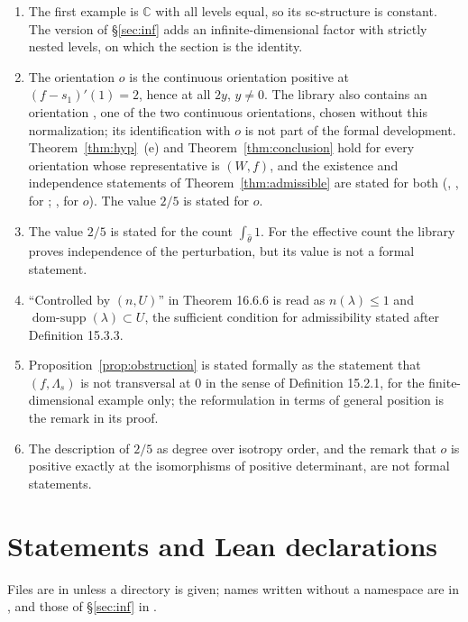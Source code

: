 \documentclass[11pt,a4paper]{article}
\theoremstyle{plain}
\theoremstyle{definition}
\theoremstyle{remark}
\newcommand{\C}{\mathbb{C}}
\newcommand{\domsupp}{\operatorname{dom-supp}}
\begin{document}
\begin{enumerate}[label=(\arabic*)]
\item The first example is $\C$ with all levels equal, so its sc-structure is constant. The version of
  \S\ref{sec:inf} adds an infinite-dimensional factor with strictly nested levels, on which the section is
  the identity.
\item The orientation $o$ is the continuous orientation positive at $(f-s_1)'(1)=2$, hence at all
  $2y$, $y\neq0$. The library also contains an orientation , one of the two
  continuous orientations, chosen without this normalization; its identification with $o$ is not part of
  the formal development. Theorem~\ref{thm:hyp}~(e) and Theorem~\ref{thm:conclusion} hold for every
  orientation whose representative is $(W,f)$, and the existence and independence statements of
  Theorem~\ref{thm:admissible} are stated for both (, ,
   for ; ,
   for $o$). The value $2/5$ is stated for $o$.
\item The value $2/5$ is stated for the count $\int_{\hat\theta}1$. For the effective count the library
  proves independence of the perturbation, but its value is not a formal statement.
\item ``Controlled by $(n,U)$'' in Theorem 16.6.6 is read as $n(\lambda)\le1$ and
  $\domsupp(\lambda)\subset U$, the sufficient condition for admissibility stated after
  Definition 15.3.3.
\item Proposition~\ref{prop:obstruction} is stated formally as the statement that $(f,\Lambda_s)$ is not transversal at $0$ in
  the sense of Definition 15.2.1, for the finite-dimensional example only; the reformulation in terms of
  general position is the remark in its proof.
\item The description of $2/5$ as degree over isotropy order, and the remark that $o$ is positive
  exactly at the isomorphisms of positive determinant, are not formal statements.
\end{enumerate}

\appendix
\section{Statements and Lean declarations}

Files are in  unless a directory is given; names written without a namespace are
in , and those of \S\ref{sec:inf} in
.
\end{document}
